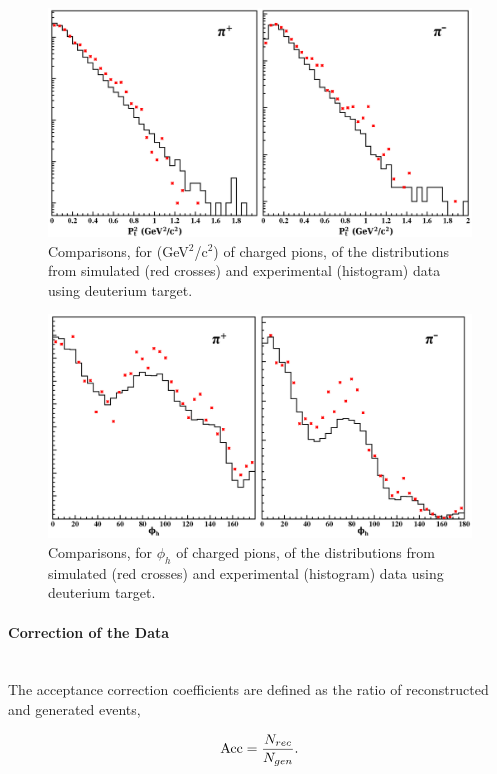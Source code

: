 \begin{figure}[tbp]
\centering
\includegraphics[width=12cm] {chap5-fig/pts_compar.png}
\caption {Comparisons, for \pt (GeV$^2$/c$^2$) of charged pions, of the distributions
from simulated (red crosses) and experimental (histogram) data using deuterium target.}
\label{fig:compPts}
\end{figure}

\begin{figure}[tbp]
\centering
\includegraphics[width=12cm] {chap5-fig/phih_compar.png}
\caption {Comparisons, for $\phi_h$ of charged pions, of the distributions
from simulated (red crosses) and experimental (histogram) data using deuterium target.}
\label{fig:compPhih}
\end{figure}


\paragraph{Correction of the Data} ~\\
The acceptance correction coefficients are defined as the ratio of reconstructed and generated events,

\begin{equation}
\label{eq:acc}
\text{Acc} = {N_{rec} \over N_{gen}}.
\end{equation}

